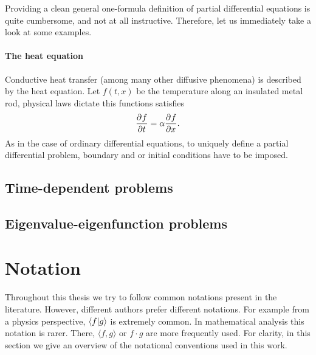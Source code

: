 Providing a clean general one-formula definition of partial differential equations is quite cumbersome, and not at all instructive. Therefore, let us immediately take a look at some examples.

\paragraph{The heat equation} Conductive heat transfer (among many other diffusive phenomena) is described by the heat equation. Let $f(t, x)$ be the temperature along an insulated metal rod, physical laws dictate this functions satisfies
$$
    {\pdv[]{f}{t}} = \alpha \pdv[]{f}{x}\text{.}
$$
As in the case of ordinary differential equations, to uniquely define a partial differential problem, boundary and or initial conditions have to be imposed.


\subsection{Time-dependent problems}

\subsection{Eigenvalue-eigenfunction problems}

\section{Notation}

Throughout this thesis we try to follow common notations present in the literature. However, different authors prefer different notations. For example from a physics perspective, $\bra{f}\ket{g}$ is extremely common. In mathematical analysis this notation is rarer. There, $\langle f, g \rangle$ or $f \cdot g$ are more frequently used. For clarity, in this section we give an overview of the notational conventions used in this work.

